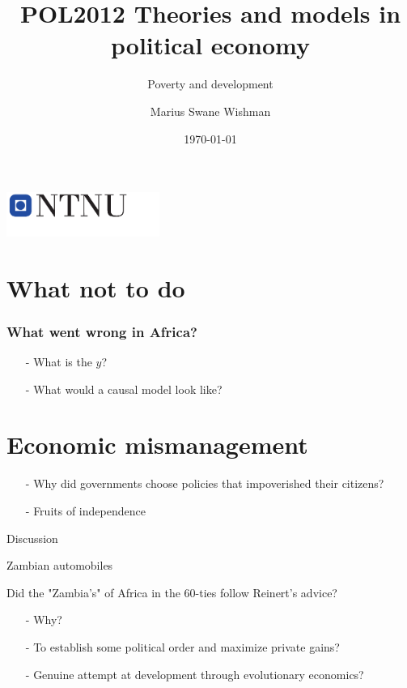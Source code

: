 \documentclass{beamer}
\title[POL2012]{POL2012 Theories and models in political economy}
\subtitle{Poverty and development}
\author[Wishman]{Marius Swane Wishman}
\date{\today}
\institute{ISS}
\begin{document}
\begin{frame}[plain]
\titlepage 
\centering
\includegraphics[width=5cm]{logo_ntnu_u-slagord.pdf} 
\end{frame}

\section{What not to do} 

\begin{frame}
\frametitle{What went wrong in Africa?}
	\begin{itemize}
		\item[-] What is the $y$?\pause %
		\item[-] What would a causal model look like? 
	\end{itemize}
\end{frame}

\section{Economic mismanagement}

\begin{frame}{}

	\begin{itemize}
		\item[-] Why did governments choose policies that impoverished
			their citizens? \pause
		\item[-] Fruits of independence \pause
	\end{itemize}

\end{frame}

\begin{frame}{Discussion}

	Zambian automobiles
	
	Did the "Zambia's" of Africa in the 60-ties follow Reinert's advice?

	\begin{itemize}
		\item[-] Why? \pause
		\item[-] To establish some political order and maximize private gains?
		\item[-] Genuine attempt at development through evolutionary
			economics?
	\end{itemize}

\end{frame}
\end{document}
